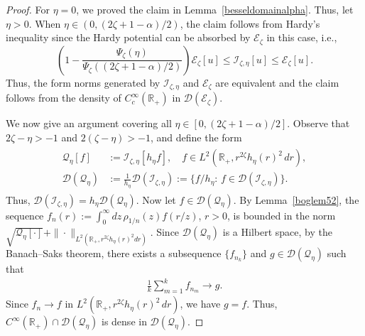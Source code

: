 \documentclass[12pt,reqno]{amsart}
\theoremstyle{definition}
\theoremstyle{remark}
\numberwithin{equation}{section}
\newcommand{\1}{\mathbbm{1}}
\newcommand{\D}{\mathcal{D}}
\newcommand{\R}{\mathbb{R}}
\def\ce{\mathcal{E}}
\def\ci{\mathcal{I}}
\def\cq{\mathcal{Q}}
\begin{document}
\begin{proof}
  For $\eta=0$, we proved the claim in Lemma~\ref{besseldomainalpha}. Thus, let $\eta>0$.
  When $\eta\in(0,(2\zeta+1-\alpha)/2)$, the claim follows from Hardy's inequality since the Hardy potential can be absorbed by $\ce_{\zeta}$ in this case, i.e.,
  $$
  \left(1-\frac{\Psi_\zeta(\eta)}{\Psi_\zeta((2\zeta+1-\alpha)/2)}\right)\ce_\zeta[u]
  \leq \ci_{\zeta,\eta}[u]
  \leq \ce_{\zeta}[u].
  $$
  Thus, the form norms generated by $\ci_{\zeta,\eta}$ and $\ce_\zeta$ are equivalent and the claim follows from the density of $C_c^\infty(\R_+)$ in $\D(\ce_\zeta)$.

  We now give an argument covering all $\eta\in[0,(2\zeta+1-\alpha)/2]$.
  Observe that $2\zeta-\eta>-1$ and $2(\zeta-\eta)>-1$, and define the form
  \begin{align}
    \begin{split}
      \cq_\eta[f] & := \ci_{\zeta,\eta}[h_{\eta}f],\quad f\in L^2(\R_+,r^{2\zeta}h_{\eta}(r)^2\,dr), \\
      \D(\cq_\eta) & := \frac{1}{h_{\eta}} \D(\ci_{\zeta,\eta}) := \{f/h_{\eta}:\,f\in\D(\ci_{\zeta,\eta})\}.
    \end{split}
  \end{align}
  Thus, $\D(\ci_{\zeta,\eta})=h_{\eta}\D(\cq_\eta)$. Now let $f\in\D(\cq_{\eta})$. By Lemma~\ref{boglem52}, the sequence $f_n(r):=\int_0^\infty dz\, \rho_{1/n}(z)f(r/z)$, $r>0$, is bounded in the norm $\sqrt{\cq_{\eta}[\cdot]} + \|\cdot\|_{L^2(\R_+,r^{2\zeta}h_{\eta}(r)^2 dr)}$.
  Since $\D(\cq_\eta)$ is a Hilbert space, by the Banach--Saks theorem, there exists a subsequence $\{f_{n_k}\}$ and $g\in\D(\cq_{\eta})$ such that
  \begin{align}
    \frac 1k \sum_{m=1}^k f_{n_m} \to g.
  \end{align}
  Since $f_n\to f$ in $L^2(\R_+,r^{2\zeta}h_{\eta}(r)^2\,dr)$, we have $g=f$. Thus, $C^\infty(\R_+)\cap\D(\cq_{\eta})$ is dense in $\D(\cq_{\eta})$.


\end{proof}
\end{document}
